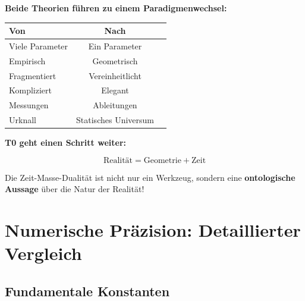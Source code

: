 	\begin{gemeinsam}
		\textbf{Beide Theorien führen zu einem Paradigmenwechsel:}
		
		\begin{center}
			\begin{tabular}{lcc}
				\toprule
				\textbf{Von} & \textbf{Nach} \\
				\midrule
				Viele Parameter & Ein Parameter \\
				Empirisch & Geometrisch \\
				Fragmentiert & Vereinheitlicht \\
				Kompliziert & Elegant \\
				Messungen & Ableitungen \\
				Urknall & Statisches Universum \\
				\bottomrule
			\end{tabular}
		\end{center}
	\end{gemeinsam}
	
	\begin{vorteil}
		\textbf{T0 geht einen Schritt weiter:}
		
		\begin{equation}
			\boxed{\text{Realität} = \text{Geometrie} + \text{Zeit}}
		\end{equation}
		
		Die Zeit-Masse-Dualität ist nicht nur ein Werkzeug, sondern eine \textbf{ontologische Aussage} über die Natur der Realität!
	\end{vorteil}
	
	\section{Numerische Präzision: Detaillierter Vergleich}
	
	\subsection{Fundamentale Konstanten}
	
	\begin{center}
	\end{center}
	
